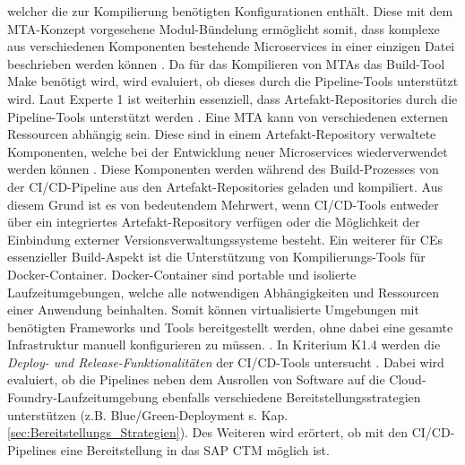 welcher die zur Kompilierung benötigten Konfigurationen enthält. Diese mit dem MTA-Konzept vorgesehene Modul-Bündelung ermöglicht somit, dass komplexe aus verschiedenen Komponenten bestehende Microservices in einer einzigen Datei beschrieben werden können \cite{.20230405b}. Da für das Kompilieren von MTAs das Build-Tool Make benötigt wird, wird evaluiert, ob dieses durch die Pipeline-Tools unterstützt wird. Laut Experte 1 ist weiterhin essenziell, dass Artefakt-Repositories durch die Pipeline-Tools unterstützt werden \cite[Z. 15 ff.]{ProductOwnerSAPBTPProd&Infra.}. Eine MTA kann von verschiedenen externen Ressourcen abhängig sein. Diese sind in einem Artefakt-Repository verwaltete Komponenten, welche bei der Entwicklung neuer Microservices wiederverwendet werden können \cite[Z. 40 ff.]{ProductOwnerSAPBTPProd&Infra.}. Diese Komponenten werden während des Build-Prozesses von der CI/CD-Pipeline aus den Artefakt-Repositories geladen und kompiliert. Aus diesem Grund ist es von bedeutendem Mehrwert, wenn CI/CD-Tools entweder über ein integriertes Artefakt-Repository verfügen oder die Möglichkeit der Einbindung externer Versionsverwaltungssysteme besteht. Ein weiterer für CEs essenzieller Build-Aspekt ist die Unterstützung von Kompilierungs-Tools für Docker-Container. Docker-Container sind portable und isolierte Laufzeitumgebungen, welche alle notwendigen Abhängigkeiten und Ressourcen einer Anwendung beinhalten. Somit können virtualisierte Umgebungen mit benötigten Frameworks und Tools bereitgestellt werden, ohne dabei eine gesamte Infrastruktur manuell konfigurieren zu müssen. \cite{Arora.20200504}. In Kriterium K1.4 werden die \textit{Deploy- und Release-Funktionalitäten} der CI/CD-Tools untersucht \cite[Z. 73 ff.]{ProductOwnerSAPBTPProd&Infra.}. Dabei wird evaluiert, ob die Pipelines neben dem Ausrollen von Software auf die Cloud-Foundry-Laufzeitumgebung ebenfalls verschiedene Bereitstellungsstrategien unterstützen (z.B. Blue/Green-Deployment s. Kap. \ref{sec:Bereitstellungs_Strategien}). Des Weiteren wird erörtert, ob mit den CI/CD-Pipelines eine Bereitstellung in das \ac{SAP CTM} möglich ist.
